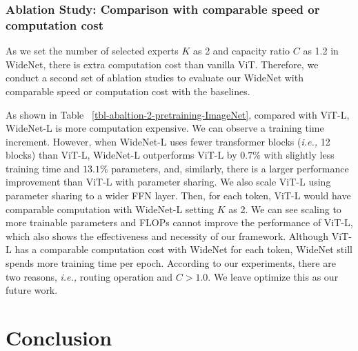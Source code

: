 \documentclass[letterpaper]{article} \usepackage{aaai22}  \usepackage{times}  \usepackage{helvet}  \usepackage{courier}  \usepackage[hyphens]{url}  \usepackage{graphicx} \urlstyle{rm} \def\UrlFont{\rm}  \usepackage{natbib}  \usepackage{caption} \DeclareCaptionStyle{ruled}{labelfont=normalfont,labelsep=colon,strut=off} \frenchspacing  \setlength{\pdfpagewidth}{8.5in}  \setlength{\pdfpageheight}{11in}  \usepackage{algorithm}
\newcommand{\ie}{\emph{i.e.,}\xspace}
\begin{document}
\subsubsection{Ablation Study: Comparison with comparable speed or computation cost}
As we set the number of selected experts $K$ as 2 and capacity ratio $C$ as 1.2 in WideNet, there is extra computation cost than vanilla ViT. Therefore, we conduct a second set of ablation studies to evaluate our WideNet with comparable speed or computation cost with the baselines.  

As shown in Table ~\ref{tbl-abaltion-2-pretraining-ImageNet}, compared with ViT-L, WideNet-L is more computation expensive. We can observe a training time increment. However, when WideNet-L uses fewer transformer blocks (\ie 12 blocks) than ViT-L, WideNet-L outperforms ViT-L by $0.7\%$ with slightly less training time and $13.1\%$ parameters, and, similarly, there is a larger performance improvement than ViT-L with parameter sharing. We also scale ViT-L using parameter sharing to a wider FFN layer. Then, for each token, ViT-L would have comparable computation with WideNet-L setting $K$ as 2. We can see scaling to more trainable parameters and FLOPs cannot improve the performance of ViT-L, which also shows the effectiveness and necessity of our framework. Although ViT-L has a comparable computation cost with WideNet for each token, WideNet still spends more training time per epoch. According to our experiments, there are two reasons, \ie routing operation and $C > 1.0$. We leave optimize this as our future work.

























\section{Conclusion}
\end{document}
